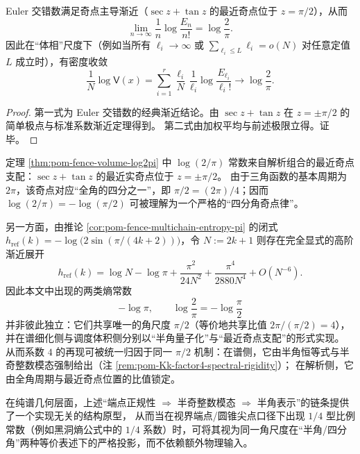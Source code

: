 \begin{theorem}\label{thm:pom-fence-volume-log2pi}
Euler 交错数满足奇点主导渐近（\(\sec z+\tan z\) 的最近奇点位于 \(z=\pi/2\)），从而
\[
\lim_{n\to\infty}\frac{1}{n}\log\frac{E_n}{n!}=\log\frac{2}{\pi}.
\]
因此在“体相”尺度下（例如当所有 \(\ell_i\to\infty\) 或 \(\sum_{\ell_i\le L}\ell_i=o(N)\) 对任意定值 \(L\) 成立时），有密度收敛
\[
\frac{1}{N}\log\mathsf V(x)
=\sum_{i=1}^r \frac{\ell_i}{N}\,\frac{1}{\ell_i}\log\frac{E_{\ell_i}}{\ell_i!}
\longrightarrow
\log\frac{2}{\pi}.
\]
\end{theorem}
\begin{proof}
第一式为 Euler 交错数的经典渐近结论。由 \(\sec z+\tan z\) 在 \(z=\pm\pi/2\) 的简单极点与标准系数渐近定理得到。
第二式由加权平均与前述极限立得。证毕。
\end{proof}

\begin{remark}\label{rem:pom-quarter-turn-pi2-scale}
定理 \ref{thm:pom-fence-volume-log2pi} 中 \(\log(2/\pi)\) 常数来自解析组合的最近奇点支配：\(\sec z+\tan z\) 的最近实奇点位于 \(z=\pm\pi/2\)。
由于三角函数的基本周期为 \(2\pi\)，该奇点对应“全角的四分之一”，即 \(\pi/2=(2\pi)/4\)；因而 \(\log(2/\pi)=-\log(\pi/2)\) 可被理解为一个严格的“四分角奇点律”。
\par
另一方面，由推论 \ref{cor:pom-fence-multichain-entropy-pi} 的闭式
\(
h_{\mathrm{ref}}(k)=-\log\!\bigl(2\sin(\pi/(4k+2))\bigr)
\)，令 \(N:=2k+1\) 则存在完全显式的高阶渐近展开
\[
h_{\mathrm{ref}}(k)
=\log N-\log\pi+\frac{\pi^2}{24N^2}+\frac{\pi^4}{2880N^4}+O(N^{-6}).
\]
因此本文中出现的两类熵常数
\[
-\log\pi,\qquad \log\frac{2}{\pi}=-\log\frac{\pi}{2}
\]
并非彼此独立：它们共享唯一的角尺度 \(\pi/2\)（等价地共享比值 \(2\pi/(\pi/2)=4\)），并在谱细化侧与调度体积侧分别以“半角量子化”与“最近奇点支配”的形式实现。
从而系数 \(4\) 的再现可被统一归因于同一 \(\pi/2\) 机制：在谱侧，它由半角恒等式与半奇整数模态强制给出（注 \ref{rem:pom-Kk-factor4-spectral-rigidity}）；
在解析侧，它由全角周期与最近奇点位置的比值锁定。
\par
在纯谱几何层面，上述“端点正规性 \(\Rightarrow\) 半奇整数模态 \(\Rightarrow\) 半角表示”的链条提供了一个实现无关的结构原型，
从而当在视界端点/圆锥尖点口径下出现 \(1/4\) 型比例常数（例如黑洞熵公式中的 \(1/4\) 系数）时，可将其视为同一角尺度在“半角/四分角”两种等价表述下的严格投影，而不依赖额外物理输入。
\end{remark}

